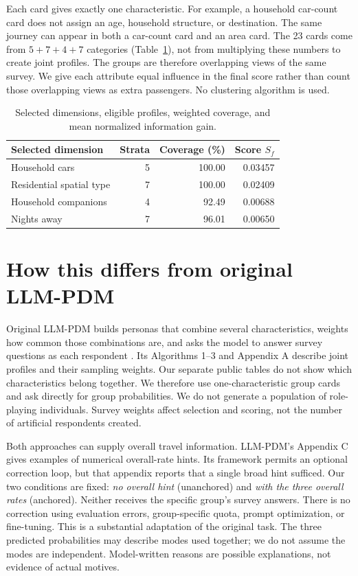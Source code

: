 \documentclass{article}
\begin{document}
Each card gives exactly one characteristic. For example, a household car-count card does not assign an age, household structure, or destination. The same journey can appear in both a car-count card and an area card. The 23 cards come from $5+7+4+7$ categories (Table~\ref{tab:selected}), not from multiplying these numbers to create joint profiles. The groups are therefore overlapping views of the same survey. We give each attribute equal influence in the final score rather than count those overlapping views as extra passengers. No clustering algorithm is used.

\begin{table}[htbp]
\centering\small
\begin{tabular}{lrrr}
\toprule
Selected dimension & Strata & Coverage (\%) & Score $S_f$\\
\midrule
Household cars & 5 & 100.00 & 0.03457\\
Residential spatial type & 7 & 100.00 & 0.02409\\
Household companions & 4 & 92.49 & 0.00688\\
Nights away & 7 & 96.01 & 0.00650\\
\bottomrule
\end{tabular}
\caption{Selected dimensions, eligible profiles, weighted coverage, and mean normalized information gain.}
\label{tab:selected}
\end{table}

\section{How this differs from original LLM-PDM}
Original LLM-PDM builds personas that combine several characteristics, weights how common those combinations are, and asks the model to answer survey questions as each respondent \citep{tzachristas2026}. Its Algorithms 1--3 and Appendix A describe joint profiles and their sampling weights. Our separate public tables do not show which characteristics belong together. We therefore use one-characteristic group cards and ask directly for group probabilities. We do not generate a population of role-playing individuals. Survey weights affect selection and scoring, not the number of artificial respondents created.

Both approaches can supply overall travel information. LLM-PDM's Appendix C gives examples of numerical overall-rate hints. Its framework permits an optional correction loop, but that appendix reports that a single broad hint sufficed. Our two conditions are fixed: \emph{no overall hint} (unanchored) and \emph{with the three overall rates} (anchored). Neither receives the specific group's survey answers. There is no correction using evaluation errors, group-specific quota, prompt optimization, or fine-tuning. This is a substantial adaptation of the original task. The three predicted probabilities may describe modes used together; we do not assume the modes are independent. Model-written reasons are possible explanations, not evidence of actual motives.
\end{document}
